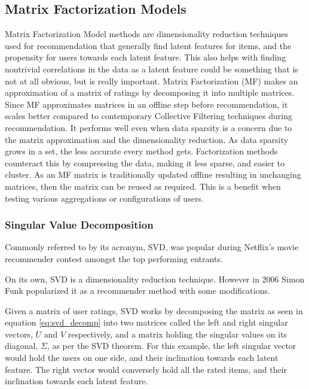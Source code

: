 \subsection{Matrix Factorization Models} \label{bg:sub:factorizationmodels}
Matrix Factorization Model methods are dimensionality reduction techniques used for recommendation that generally find latent features for items, and the propensity for users towards each latent feature. This also helps with finding nontrivial correlations in the data as a latent feature could be something that is not at all obvious, but is really important.
Matrix Factorization (MF) makes an approximation of a matrix of ratings by decomposing it into multiple matrices. Since MF approximates matrices in an offline step before recommendation, it scales better compared to contemporary Collective Filtering techniques during recommendation. It performs well even when data sparsity is a concern due to the matrix approximation and the dimensionality reduction.
As data sparsity grows in a set, the less accurate every method gets. Factorization methods counteract this by compressing the data, making it less sparse, and easier to cluster.
As an MF matrix is traditionally updated offline resulting in unchanging matrices, then the matrix can be reused as required. This is a benefit when testing various aggregations or configurations of users.

\subsubsection{Singular Value Decomposition}
Commonly referred to by its acronym, SVD, was popular during Netflix's movie recommender contest amongst the top performing entrants.

On its own, SVD is a dimensionality reduction technique. However in 2006 Simon Funk \cite{svdsimonfunk} popularized it as a recommender method with some modifications.

Given a matrix of user ratings, SVD works by decomposing the matrix as seen in equation \ref{eq:svd_decomp} into two matrices called the left and right singular vectors, $U$ and $V$ respectively, and a matrix holding the singular values on its diagonal, $\Sigma$, as per the SVD theorem\cite{svdtheorem}. For this example, the left singular vector would hold the users on one side, and their inclination towards each latent feature. The right vector would conversely hold all the rated items, and their inclination towards each latent feature.


